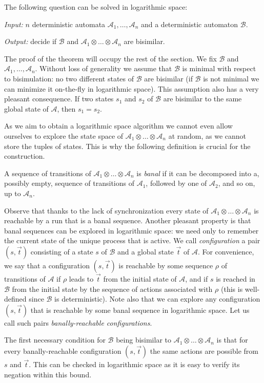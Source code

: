 \documentclass{LMCS}
\theoremstyle{plain}\newtheorem{remark}{Remark}
\theoremstyle{plain}\newtheorem{lemma}[thm]{Lemma}
\renewcommand{\Aa}{\mathcal{A}}
\renewcommand{\Bb}{\mathcal{B}}
\newcommand{\vect}{\vec t}
\newcommand{\vAa}{\Aa_1\otimes\dots\otimes\Aa_n}
\begin{document}
\begin{thm}
  The following question can be solved in logarithmic space:

  \emph{Input:} $n$ deterministic automata $\Aa_1,\dots,\Aa_n$ and a
  deterministic automaton $\Bb$.

  \emph{Output:} decide if $\Bb$ and $\vAa$ are bisimilar.
\end{thm}

The proof of the theorem will occupy the rest of the section. We fix
$\Bb$ and $\Aa_1,\dots,\Aa_n$. Without loss of generality we assume
that $\Bb$ is minimal with respect to bisimulation: no two different
states of $\Bb$ are bisimilar (if $\Bb$ is not minimal we can
minimize it on-the-fly in logarithmic space).  This
assumption also has a very pleasant consequence. If two states $s_1$
and $s_2$ of $\Bb$ are bisimilar to the same global state of $\Aa$,
then $s_1=s_2$.

As we aim to obtain a logarithmic space algorithm we cannot even allow
ourselves to explore the state space of $\vAa$ at random, as we cannot
store the tuples of states. This is why the following definition is
crucial for the construction.

\begin{defi}
  A sequence of transitions of $\vAa$ is
  \emph{banal} if it can be decomposed into a, possibly empty,
  sequence of transitions of $\Aa_1$, followed by one of $\Aa_2$,
  and so on, up to $\Aa_n$.
\end{defi}

Observe that thanks to the lack of synchronization every state of
$\vAa$ is reachable by a run that is a banal sequence. Another
pleasant property is that banal sequences can be explored in
logarithmic space: we need only to remember the current state of the
unique process that is active. We call \emph{configuration} a pair
$(s,\vect)$ consisting of a state $s$ of $\Bb$ and a global state $\vect$ of
$\Aa$. For convenience, we say that a configuration $(s,\vect)$ is
reachable by some sequence $\rho$ of transitions of $\Aa$ if $\rho$ leads
to $\vect$ from the initial state of $\Aa$, and if $s$ is reached 
in $\Bb$ from the initial state by the sequence of actions associated
with $\rho$ (this is well-defined since $\Bb$ is deterministic).  Note
also that we can explore any configuration
$(s,\vect)$ that is reachable by some banal sequence in
logarithmic space.  Let us call such pairs \emph{banally-reachable
  configurations}.

The first necessary condition for $\Bb$ being bisimilar to
$\Aa_1\otimes\dots\otimes\Aa_n$ is that for every banally-reachable
configuration $(s,\vect)$ the same actions are possible from $s$ and
$\vect$. This can be checked in logarithmic space as it is  easy to
verify its negation within this bound.
\end{document}
